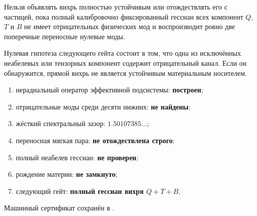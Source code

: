 \begin{nogocriterion}
Нельзя объявлять вихрь полностью устойчивым или отождествлять его с
частицей, пока полный калибровочно фиксированный гессиан всех компонент
$Q$, $T$ и $B$ не имеет отрицательных физических мод и воспроизводит
ровно две поперечные переносные нулевые моды.
\end{nogocriterion}

Нулевая гипотеза следующего гейта состоит в том, что одна из исключённых
неабелевых или тензорных компонент содержит отрицательный канал. Если он
обнаружится, прямой вихрь не является устойчивым материальным носителем.

\begin{protocol}
\begin{enumerate}
 \item нерадиальный оператор эффективной подсистемы: \textbf{построен};
 \item отрицательные моды среди десяти нижних: \textbf{не найдены};
 \item жёсткий спектральный зазор: \textbf{$1.50107385\ldots$};
 \item переносная мягкая пара: \textbf{не отождествлена строго};
 \item полный неабелев гессиан: \textbf{не проверен};
 \item рождение материи: \textbf{не замкнуто};
 \item следующий гейт: \textbf{полный гессиан вихря $Q+T+B$}.
\end{enumerate}
\end{protocol}

Машинный сертификат сохранён в
.